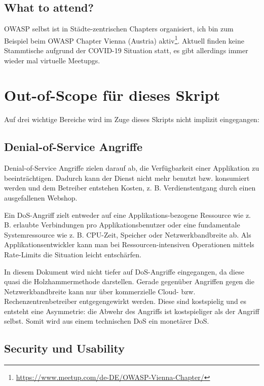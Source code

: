 \subsection{What to attend?}

OWASP selbst ist in Städte-zentrischen Chapters organisiert, ich bin zum Beispiel beim OWASP Chapter Vienna (Austria) aktiv\footnote{\url{https://www.meetup.com/de-DE/OWASP-Vienna-Chapter/}}. Aktuell finden keine Stammtische aufgrund der COVID-19 Situation statt, es gibt allerdings immer wieder mal virtuelle Meetupgs.

\section{Out-of-Scope für dieses Skript}

Auf drei wichtige Bereiche wird im Zuge dieses Skripts nicht implizit eingegangen:

\subsection{Denial-of-Service Angriffe}

Denial-of-Service Angriffe zielen darauf ab, die Verfügbarkeit einer Applikation zu beeinträchtigen. Dadurch kann der Dienst nicht mehr benutzt bzw. konsumiert werden und dem Betreiber entstehen Kosten, z. B. Verdienstentgang durch einen ausgefallenen Webshop.

Ein DoS-Angriff zielt entweder auf eine Applikations-bezogene Ressource wie z. B. erlaubte Verbindungen pro Applikationsbenutzer oder eine fundamentale Systemressource wie z. B. CPU-Zeit, Speicher oder Netzwerkbandbreite ab. Als Applikationsentwickler kann man bei Ressourcen-intensiven Operationen mittels Rate-Limits die Situation leicht entschärfen.

In diesem Dokument wird nicht tiefer auf DoS-Angriffe eingegangen, da diese quasi die Holzhammermethode darstellen. Gerade gegenüber Angriffen gegen die Netzwerkbandbreite kann nur über kommerzielle Cloud- bzw. Rechenzentrenbetreiber entgegengewirkt werden. Diese sind kostspielig und es entsteht eine Asymmetrie: die Abwehr des Angriffs ist kostspieliger als der Angriff selbst. Somit wird aus einem technischen DoS ein monetärer DoS.

\subsection{Security und Usability}

